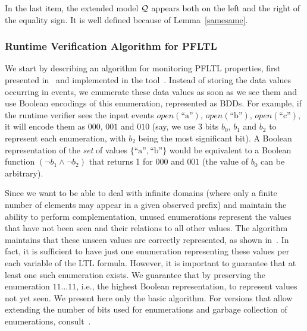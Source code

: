 


In the last item, the extended model ${\cal Q}$ appears both on the left and the right of the equality sign. It is well defined because of Lemma~\ref{samesame}.

\subsubsection{Runtime Verification Algorithm for PFLTL}

We start by describing an algorithm for monitoring 
PFLTL properties, first presented in~\cite{HPU} and implemented
in the tool~\dejavu. 
Instead of storing the data values occurring in events, 
we enumerate these data values as soon as we see them and use Boolean
encodings of this enumeration, represented as BDDs.
For example, if the runtime verifier sees the input 
events 
$\mathit{open}(\text{``a''})$, 
$\mathit{open}(\text{``b''})$, 
$\mathit{open}(\text{``c''})$, 
it will encode them as
$000$, $001$ and $010$ (say, we use 3 bits $b_0$, $b_1$ and $b_2$
to represent each enumeration, with $b_2$ being the most significant bit).
%
A Boolean representation of the {\em set} of values 
$\{\text{``a''},\text{``b''}\} $ would be equivalent to a Boolean function $(\neg b_1 \wedge \neg b_2)$ that returns 1 for $000$ and $001$ (the value
of $b_0$ can be arbitrary).

%

Since we want to be able to deal with infinite domains
(where only a finite number of elements may appear in a given observed prefix) and maintain the ability to perform
complementation, unused enumerations represent the
values that have not been seen and their relations
to all other values. The algorithm maintains that these unseen values are correctly represented, as shown in~\cite{HPU}. In fact, it is sufficient to have just one enumeration representing these values per each variable of the LTL formula. However, it is important to guarantee that at least one such enumeration
exists. We guarantee that by preserving the enumeration $11\ldots11$, i.e., the highest Boolean representation,
to represent values not yet seen.
We present here only the basic algorithm. For versions that
allow extending the number of bits used for enumerations and garbage collection of enumerations, consult~\cite{HP}.

